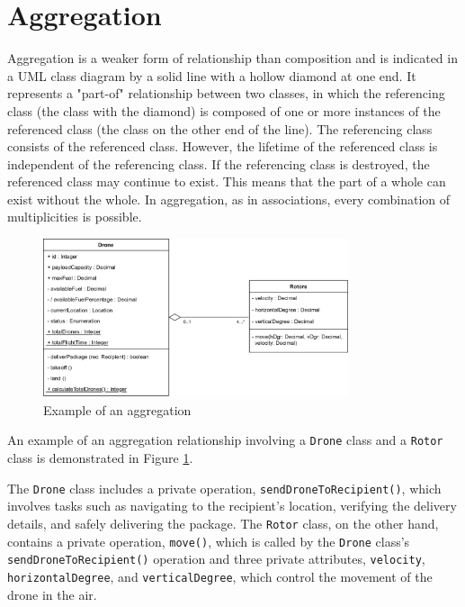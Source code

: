 \documentclass[
	12pt,
    a4paper,
    egregdoesnotlikesansseriftitles, %
    toc=chapterentrywithdots,
    oneside, openany,
    titlepage,
    parskip=half,
    headings=normal,  %
    listof=totoc,
    bibliography=totoc,
    index=totoc,
    captions=tableheading,  %
    listof=flat,
    numbers=noenddot, %
    final]
    {scrbook}
\begin{document}
\section{Aggregation}
Aggregation is a weaker form of relationship than composition and is indicated in a UML class diagram by a solid line with a hollow diamond at one end. 
It represents a "part-of" relationship between two classes, in which the referencing class (the class with the diamond) is composed of one or more instances of the referenced class (the class on the other end of the line).
The referencing class consists of the referenced class.
However, the lifetime of the referenced class is independent of the referencing class.
If the referencing class is destroyed, the referenced class may continue to exist.
This means that the part of a whole can exist without the whole.
In aggregation, as in associations, every combination of multiplicities is possible. \cite[p. 153]{uml}


\begin{figure}[h]
	\centering
	\includegraphics[width=0.8\textwidth]{figures/aggr_comp/aggr.jpg}
	\caption[Example aggregation]{Example of an aggregation}
	\label{fig:aggregation_example} 
\end{figure}


An example of an aggregation relationship involving a \texttt{Drone} class and a \texttt{Rotor} class is demonstrated in Figure \ref{fig:aggregation_example}. 

The \texttt{Drone} class includes a private operation, \texttt{sendDroneToRecipient()}, which involves tasks such as navigating to the recipient's location, verifying the delivery details, and safely delivering the package.
The \texttt{Rotor} class, on the other hand, contains a private operation, \texttt{move()}, which is called by the \texttt{Drone} class's \texttt{sendDroneToRecipient()} operation and three private attributes, \texttt{velocity}, \texttt{horizontalDegree}, and \texttt{verticalDegree}, which control the movement of the drone in the air. 
\end{document}

